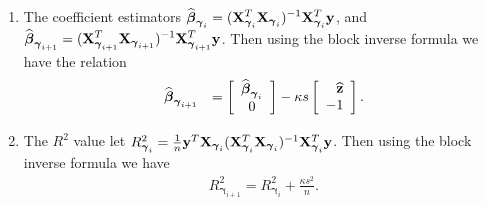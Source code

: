\documentclass[12pt]{article}
\def\vectorfontone{\bf}
\def\vectorfonttwo{\boldsymbol}
\def\vy{{\vectorfontone y}}                      %
\def\vz{{\vectorfontone z}}                      %
\def\vbeta{{\vectorfonttwo \beta}}               %
\def\vgamma{{\vectorfonttwo \gamma}}             %
\def\matrixfontone{\bf}
\def\mC{{\matrixfontone C}}                      %
\def\mX{{\matrixfontone X}}                      %
\def\ds{\displaystyle}
\begin{document}
\begin{enumerate}
	\item
	The coefficient estimators 
	$ 
	\ds \widehat{\vbeta}_{\vgamma_{i}} = (\mX_{\vgamma_{i}}^T\mX_{\vgamma_{i}})^{-1}\mX_{\vgamma_{i}}^T\vy$,
	and $\ds \widehat{\vbeta}_{\vgamma_{i+1}}  = (\mX_{\vgamma_{i+1}}^T\mX_{\vgamma_{i+1}})^{-1}\mX_{\vgamma_{i+1}}^T\vy$.  
	Then using the block inverse formula we have
	the relation
	$$
	\begin{array}{rl}
	\ds \widehat{\vbeta}_{\vgamma_{i+1}}
	& \ds 
	= \left[ \begin{array}{c}
	\widehat{\vbeta}_{\vgamma_{i}} \\
	0 
	\end{array} \right] - \kappa s  \left[ \begin{array}{r}
	\widehat{\vz}   \\
	- 1
	\end{array} \right].
	\end{array} 
	$$
	
	\item The $R^2$ value let 
	$R_{\vgamma_{i}}^2 = \tfrac{1}{n} \vy^T\mX_{\vgamma_{i}}(\mX_{\vgamma_{i}}^T\mX_{\vgamma_{i}})^{-1}\mX_{\vgamma_{i}}^T\vy$.
	Then using the block inverse formula we have
	$$
	\begin{array}{rl}
	\ds 
	R_{\vgamma_{i+1}}^2 
	= R_{\vgamma_{i}}^2
	+ \frac{\kappa s^2}{n}.
	
	\end{array}
	$$
	
\end{enumerate}
\end{document}
